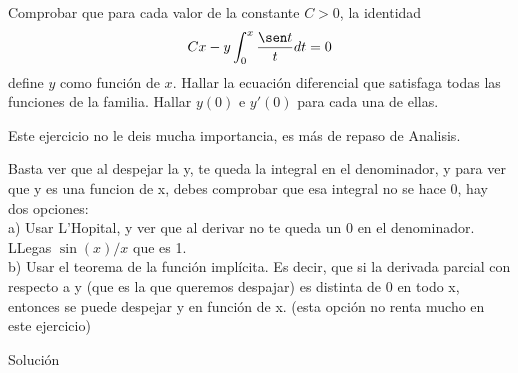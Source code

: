 \documentclass[nochap]{apuntes}
\begin{document}
\begin{problem}[3]
Comprobar que para cada valor de la constante $C>0$, la identidad
\begin{gather*}
Cx-y \int_0^x\frac{\sen t}{t}dt=0
\end{gather*}
define $y$ como función de $x$. Hallar la ecuación diferencial que satisfaga todas las funciones de la familia. Hallar $y(0)$ e $y'(0)$ para cada una de ellas.

\solution

\begin{expla}
Este ejercicio no le deis mucha importancia, es más de repaso de Analisis.

Basta ver que al despejar la y, te queda la integral en el denominador, y para ver que y es una funcion de x, debes comprobar que esa integral no se hace 0, hay dos opciones:\\
a) Usar L'Hopital, y ver que al derivar no te queda un 0 en el denominador. LLegas $\sin (x)/x$ que es 1.\\
b) Usar el teorema de la función implícita. Es decir, que si la derivada parcial con respecto a y (que es la que queremos despajar) es distinta de 0 en todo x, entonces se puede despejar y en función de x. (esta opción no renta mucho en este ejercicio)
\end{expla}

Solución

\end{problem}
\newpage
\end{document}
